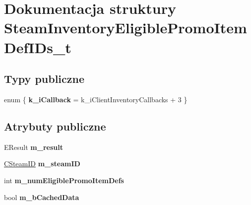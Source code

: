 \hypertarget{struct_steam_inventory_eligible_promo_item_def_i_ds__t}{}\section{Dokumentacja struktury Steam\+Inventory\+Eligible\+Promo\+Item\+Def\+I\+Ds\+\_\+t}
\label{struct_steam_inventory_eligible_promo_item_def_i_ds__t}
\subsection*{Typy publiczne}
\begin{DoxyCompactItemize}
\item 
\mbox{\label{struct_steam_inventory_eligible_promo_item_def_i_ds__t_aedd9d607d709485515cc1a016e0a288a}} 
enum \{ {\bfseries k\+\_\+i\+Callback} = k\+\_\+i\+Client\+Inventory\+Callbacks + 3
 \}
\end{DoxyCompactItemize}
\subsection*{Atrybuty publiczne}
\begin{DoxyCompactItemize}
\item 
\mbox{\label{struct_steam_inventory_eligible_promo_item_def_i_ds__t_a4e82ecee4ff77e1c10b71abfdb2961e3}} 
E\+Result {\bfseries m\+\_\+result}
\item 
\mbox{\label{struct_steam_inventory_eligible_promo_item_def_i_ds__t_aa81ed63200318e68b1d9d47c18fd164c}} 
\hyperlink{class_c_steam_i_d}{C\+Steam\+ID} {\bfseries m\+\_\+steam\+ID}
\item 
\mbox{\label{struct_steam_inventory_eligible_promo_item_def_i_ds__t_a275e3b536eeaf768fe46aeed7cf7689a}} 
int {\bfseries m\+\_\+num\+Eligible\+Promo\+Item\+Defs}
\item 
\mbox{\label{struct_steam_inventory_eligible_promo_item_def_i_ds__t_a9481fa6146a1f0dbbb5bd3bf40053f61}} 
bool {\bfseries m\+\_\+b\+Cached\+Data}
\end{DoxyCompactItemize}


